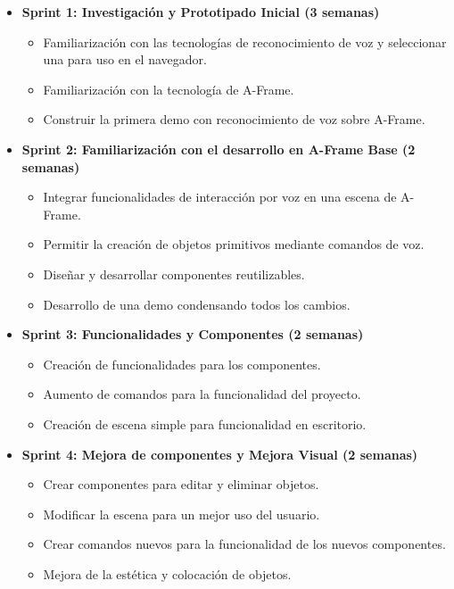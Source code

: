 \documentclass[a4paper, 12pt]{book}
\begin{document}
\begin{itemize}
  \item \textbf{Sprint 1: Investigación y Prototipado Inicial (3 semanas)}
 \begin{itemize}
  \item Familiarización con las tecnologías de reconocimiento de voz y seleccionar una para uso en el navegador.
  \item Familiarización con la tecnología de A-Frame.
  \item Construir la primera demo con reconocimiento de voz sobre A-Frame.
 \end{itemize}

 \item \textbf{Sprint 2: Familiarización con el desarrollo en A-Frame Base (2 semanas)}
 \begin{itemize}
  \item Integrar funcionalidades de interacción por voz en una escena de A-Frame.
  \item Permitir la creación de objetos primitivos mediante comandos de voz.
  \item Diseñar y desarrollar componentes reutilizables.
  \item Desarrollo de una demo condensando todos los cambios.
 \end{itemize}

 \item \textbf{Sprint 3: Funcionalidades y Componentes (2 semanas)}
  \begin{itemize}
   \item Creación de funcionalidades para los componentes.
 \item Aumento de comandos para la funcionalidad del proyecto.
 \item Creación de escena simple para funcionalidad en escritorio.
  \end{itemize}

 \item \textbf{Sprint 4: Mejora de componentes y Mejora Visual (2 semanas)}
  \begin{itemize}
   \item Crear componentes para editar y eliminar objetos.
\item Modificar la escena para un mejor uso del usuario.
\item Crear comandos nuevos para la funcionalidad de los nuevos componentes.
\item Mejora de la estética y colocación de objetos.
  \end{itemize}


\end{itemize}
\end{document}

